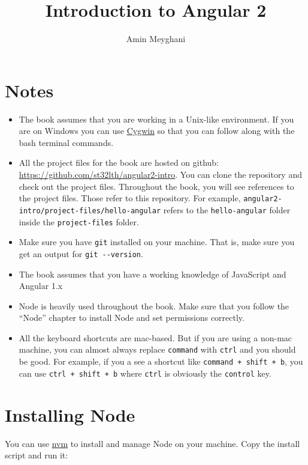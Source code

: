 \documentclass[12pt,]{article}
\title{Introduction to Angular 2}
\author{Amin Meyghani}
\date{}
\begin{document}
\maketitle

{
\hypersetup{linkcolor=black}
\setcounter{tocdepth}{5}
\tableofcontents
}
\section{Notes}\label{notes}

\begin{itemize}
\item
  The book assumes that you are working in a Unix-like environment. If
  you are on Windows you can use \href{https://www.cygwin.com/}{Cygwin}
  so that you can follow along with the bash terminal commands.
\item
  All the project files for the book are hosted on github:
  \url{https://github.com/st32lth/angular2-intro}. You can clone the
  repository and check out the project files. Throughout the book, you
  will see references to the project files. Those refer to this
  repository. For example,
  \texttt{angular2-intro/project-files/hello-angular} refers to the
  \texttt{hello-angular} folder inside the \texttt{project-files}
  folder.
\item
  Make sure you have \texttt{git} installed on your machine. That is,
  make sure you get an output for \texttt{git\ -\/-version}.
\item
  The book assumes that you have a working knowledge of JavaScript and
  Angular 1.x
\item
  Node is heavily used throughout the book. Make sure that you follow
  the ``Node'' chapter to install Node and set permissions correctly.
\item
  All the keyboard shortcuts are mac-based. But if you are using a
  non-mac machine, you can almost always replace \texttt{command} with
  \texttt{ctrl} and you should be good. For example, if you a see a
  shortcut like \texttt{command\ +\ shift\ +\ b}, you can use
  \texttt{ctrl\ +\ shift\ +\ b} where \texttt{ctrl} is obviously the
  \texttt{control} key.
\end{itemize}

\section{Installing Node}\label{installing-node}

You can use \href{https://github.com/creationix/nvm}{nvm} to install and
manage Node on your machine. Copy the install script and run it:
\end{document}
